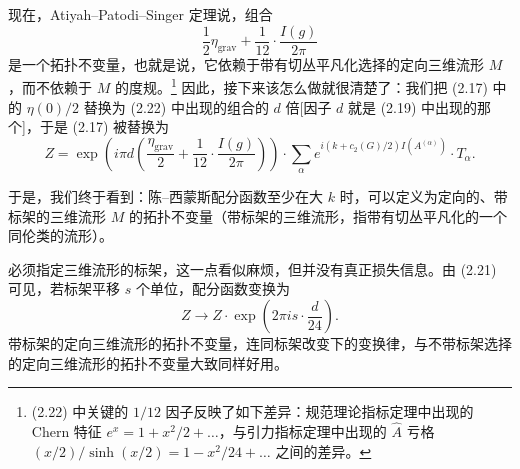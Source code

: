 \documentclass[11pt,a4paper]{article}
\begin{document}
现在，Atiyah--Patodi--Singer 定理说，组合
\begin{equation}
    \frac{1}{2}\eta_{\mathrm{grav}}+\frac{1}{12}\cdot\frac{I(g)}{2\pi}
    \tag{2.22}
\end{equation}
是一个拓扑不变量，也就是说，它依赖于带有切丛平凡化选择的定向三维流形 $M$，而不依赖于 $M$ 的度规。\footnote{(2.22) 中关键的 $1/12$ 因子反映了如下差异：规范理论指标定理中出现的 Chern 特征 $e^x=1+x^2/2+\dots$，与引力指标定理中出现的 $\hat{A}$ 亏格 $(x/2)/\sinh(x/2)=1-x^2/24+\dots$ 之间的差异。} 因此，接下来该怎么做就很清楚了：我们把 (2.17) 中的 $\eta(0)/2$ 替换为 (2.22) 中出现的组合的 $d$ 倍[因子 $d$ 就是 (2.19) 中出现的那个]，于是 (2.17) 被替换为
\begin{equation}
    Z=\exp\left(i\pi d\left(\frac{\eta_{\mathrm{grav}}}{2}+\frac{1}{12}\cdot\frac{I(g)}{2\pi}\right)\right)\cdot\sum_\alpha e^{i\left(k+c_2(G)/2\right)I(A^{(\alpha)})}\cdot T_\alpha.
    \tag{2.23}
\end{equation}

于是，我们终于看到：陈–西蒙斯配分函数至少在大 $k$ 时，可以定义为定向的、带标架的三维流形 $M$ 的拓扑不变量（带标架的三维流形，指带有切丛平凡化的一个同伦类的流形）。

必须指定三维流形的标架，这一点看似麻烦，但并没有真正损失信息。由 (2.21) 可见，若标架平移 $s$ 个单位，配分函数变换为
\begin{equation}
    Z\to Z\cdot\exp\left(2\pi i s\cdot\frac{d}{24}\right).
    \tag{2.24}
\end{equation}
带标架的定向三维流形的拓扑不变量，连同标架改变下的变换律，与不带标架选择的定向三维流形的拓扑不变量大致同样好用。

\end{document}
